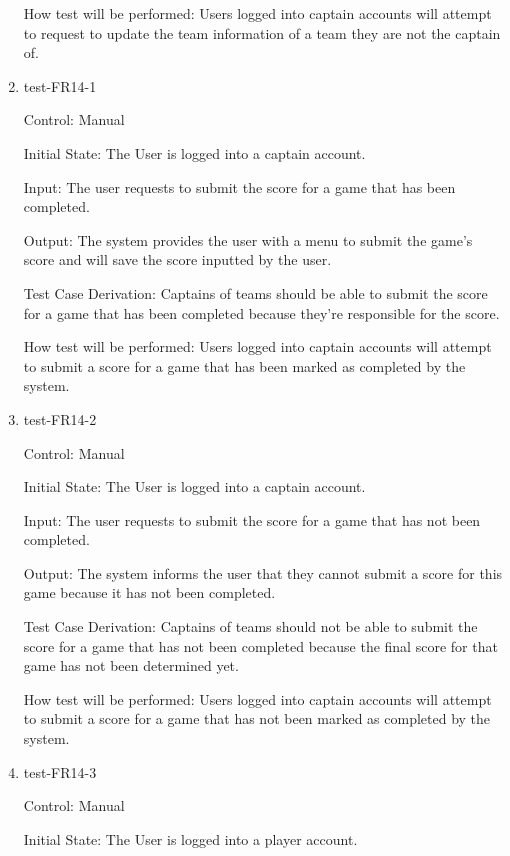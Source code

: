 \documentclass[12pt, titlepage]{article}
\begin{document}
\begin{enumerate}
  How test will be performed: Users logged into captain accounts will attempt
  to request to update the team information of a team they are not the captain
  of.

  \item{test-FR14-1\\}

  Control: Manual
           
  Initial State: The User is logged into a captain account.
           
  Input: The user requests to submit the score for a game that has been
  completed.
           
  Output: The system provides the user with a menu to submit the game's
  score and will save the score inputted by the user.
 
  Test Case Derivation: Captains of teams should be able to submit the score
  for a game that has been completed because they're responsible for the
  score.
 
  How test will be performed: Users logged into captain accounts will attempt
  to submit a score for a game that has been marked as completed by the system.

  \item{test-FR14-2\\}

  Control: Manual
           
  Initial State: The User is logged into a captain account.
           
  Input: The user requests to submit the score for a game that has not
  been completed.
           
  Output: The system informs the user that they cannot submit a score
  for this game because it has not been completed.
 
  Test Case Derivation: Captains of teams should not be able to 
  submit the score for a game that has not been completed because 
  the final score for that game has not been determined yet.
 
  How test will be performed: Users logged into captain accounts will attempt
  to submit a score for a game that has not been marked as completed by 
  the system.

  \item{test-FR14-3\\}

  Control: Manual
           
  Initial State: The User is logged into a player account.
           

\end{enumerate}
\end{document}
